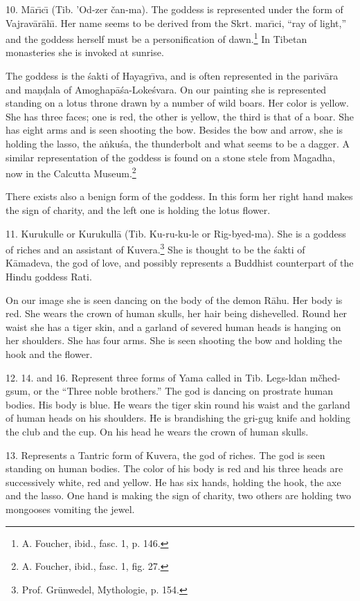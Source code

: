 \documentclass[a4paper, 12pt, oneside]{article}
\begin{document}
10. M\={a}r\={\i}c\={\i} (Tib. 'Od-zer čan-ma). The goddess is represented under the form of Vajrav\={a}r\={a}h\={\i}. Her name seems to be derived from the Skrt. mar\={\i}ci, ``ray of light,'' and the goddess herself must be a personification of dawn.\footnote{A. Foucher, ibid., fasc. 1, p. 146.} In Tibetan monasteries she is invoked at sunrise.

The goddess is the \'{s}akti of Hayagr\={\i}va, and is often represented in the pariv\={a}ra and ma\d{n}\d{d}ala of Amoghap\={a}\'{s}a-Loke\'{s}vara. On our painting she is represented standing on a lotus throne drawn by a number of wild boars. Her color is yellow. She has three faces; one is red, the other is yellow, the third is that of a boar. She has eight arms and is seen shooting the bow. Besides the bow and arrow, she is holding the lasso, the a\.{n}ku\'{s}a, the thunderbolt and what seems to be a dagger. A similar representation of the goddess is found on a stone stele from Magadha, now in the Calcutta Museum.\footnote{A. Foucher, ibid., fasc. 1, fig. 27.}

There exists also a benign form of the goddess. In this form her right hand makes the sign of charity, and the left one is holding the lotus flower.

11. Kurukulle or Kurukull\={a} (Tib. Ku-ru-ku-le or Rig-byed-ma). She is a goddess of riches and an assistant of Kuvera.\footnote{Prof. Grünwedel, Mythologie, p. 154.} She is thought to be the \'{s}akti of K\={a}madeva, the god of love, and possibly represents a Buddhist counterpart of the Hindu goddess Rati.

On our image she is seen dancing on the body of the demon R\={a}hu. Her body is red. She wears the crown of human skulls, her hair being dishevelled. Round her waist she has a tiger skin, and a garland of severed human heads is hanging on her shoulders. She has four arms. She is seen shooting the bow and holding the hook and the flower.

12. 14. and 16. Represent three forms of Yama called in Tib. Legs-ldan mčhed-gsum, or the ``Three noble brothers.'' The god is dancing on prostrate human bodies. His body is blue. He wears the tiger skin round his waist and the garland of human heads on his shoulders. He is brandishing the gri-gug knife and holding the club and the cup. On his head he wears the crown of human skulls.

13. Represents a Tantric form of Kuvera, the god of riches. The god is seen standing on human bodies. The color of his body is red and his three heads are successively white, red and yellow. He has six hands, holding the hook, the axe and the lasso. One hand is making the sign of charity, two others are holding two mongooses vomiting the jewel.
\end{document}
